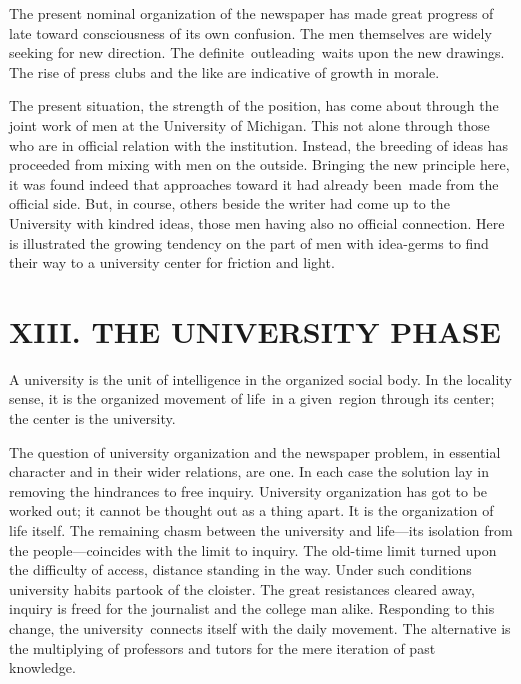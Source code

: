 \documentclass[openany,nobib]{tufte-book}
\begin{document}
The present nominal organization of the newspaper has made great
progress of late toward consciousness of its own confusion. The men
themselves are widely seeking for new direction. The
definite~outleading~waits upon the new drawings. The rise of press clubs
and the like are indicative of growth in morale.~

The present situation, the strength of the position, has come about
through the joint work of men at the University of Michigan. This not
alone through those who are in official relation with the institution.
Instead, the breeding of ideas has proceeded from mixing with men on the
outside. Bringing the new principle here, it was found indeed that
approaches toward it had already been~made from the official side. But,
in course, others beside the writer had come up to the University with
kindred ideas, those men having also no official connection. Here is
illustrated the growing tendency on the part of men with idea-germs to
find their way to a university center for friction and light.~

\hypertarget{xiii-the-university-phase}{%
\section{XIII. THE UNIVERSITY
PHASE}\label{xiii-the-university-phase}}

A university is the unit of intelligence in the organized social body.
In the locality sense, it is the organized movement of life~in a
given~region through its center; the center is the university.~

The question of university organization and the newspaper problem, in
essential character and in their wider relations, are one. In each case
the solution lay in removing the hindrances to free inquiry. University
organization has got to be worked out; it cannot be thought out as a
thing apart. It is the organization of life itself. The remaining chasm
between the university and life---its isolation from the
people---coincides with the limit to inquiry. The old-time limit turned
upon the difficulty of access, distance standing in the way. Under such
conditions university habits partook of the cloister. The great
resistances cleared away, inquiry is freed for the journalist and the
college man alike. Responding to this change, the university~connects
itself with the daily movement. The alternative is the multiplying of
professors and tutors for the mere iteration of past knowledge.~
\end{document}

